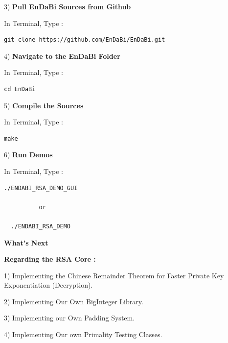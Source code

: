 \documentclass{slides}
\begin{document}
\begin{center}
3) \textbf{Pull EnDaBi Sources from Github}
\begin{center}
In Terminal, Type :
\end{center}
\begin{BVerbatim}
git clone https://github.com/EnDaBi/EnDaBi.git
\end{BVerbatim}
\end{center}
\newpage
\begin{center}
4) \textbf{Navigate to the EnDaBi Folder}
\begin{center}
In Terminal, Type :
\end{center}
\begin{BVerbatim}
cd EnDaBi
\end{BVerbatim}
\end{center}
\begin{center}
5) \textbf{Compile the Sources}
\begin{center}
In Terminal, Type :
\end{center}
\begin{BVerbatim}
make
\end{BVerbatim}
\end{center}
\begin{center}
6) \textbf{Run Demos}
\end{center}
\begin{center}
In Terminal, Type :
\end{center}
\begin{center}
\centering
\begin{BVerbatim}
./ENDABI_RSA_DEMO_GUI
          
          or
          
  ./ENDABI_RSA_DEMO
\end{BVerbatim}
\end{center}
\newpage
\begin{center}
\textbf{\Large What's Next}
\end{center}
\begin{center}
\textbf{Regarding the RSA Core :}
\end{center}
\begin{center}
1) Implementing the Chinese Remainder Theorem for Faster Private Key Exponentiation (Decryption).

2) Implementing Our Own BigInteger Library.

3) Implementing our Own Padding System.

4) Implementing Our own Primality Testing Classes.
\end{center}
\end{document}

